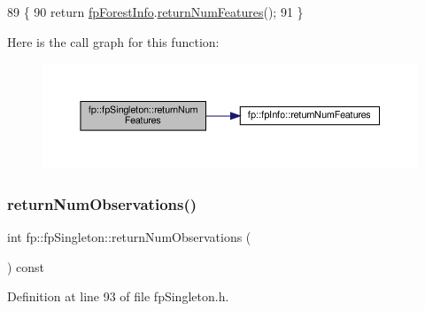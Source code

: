 \begin{DoxyCode}
89                                           \{
90                 \textcolor{keywordflow}{return} \hyperlink{classfp_1_1fpSingleton_a85965009befa72a749ae498fa5b6ccfa}{fpForestInfo}.\hyperlink{classfp_1_1fpInfo_a30ec8a4f116421a193d33fe2052aaa9a}{returnNumFeatures}();
91             \}
\end{DoxyCode}
Here is the call graph for this function\+:
\nopagebreak
\begin{figure}[H]
\begin{center}
\leavevmode
\includegraphics[width=350pt]{classfp_1_1fpSingleton_a97cbcad5ae9daa8c747fd4db84928c20_cgraph}
\end{center}
\end{figure}
\mbox{\label{classfp_1_1fpSingleton_ae0a2963feb07b809b8740218f1048b67}} 
\subsubsection{\texorpdfstring{return\+Num\+Observations()}{returnNumObservations()}}
{\footnotesize\ttfamily int fp\+::fp\+Singleton\+::return\+Num\+Observations (\begin{DoxyParamCaption}{ }\end{DoxyParamCaption}) const\hspace{0.3cm}{\ttfamily [inline]}}



Definition at line 93 of file fp\+Singleton.\+h.


